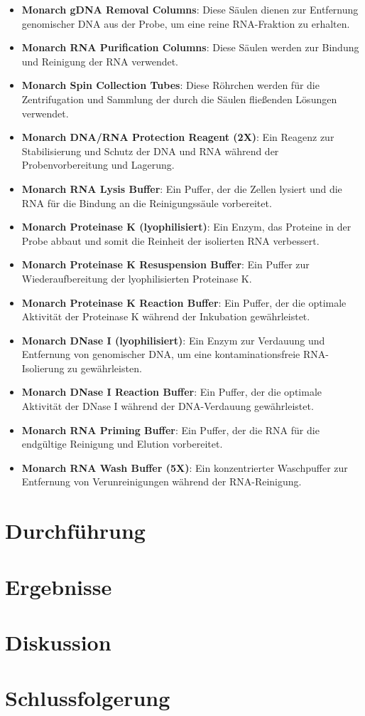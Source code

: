 \documentclass{article}
\begin{document}
\begin{itemize}
    \item \textbf{Monarch gDNA Removal Columns}: Diese Säulen dienen zur Entfernung genomischer DNA aus der Probe, um eine reine RNA-Fraktion zu erhalten.
    \item \textbf{Monarch RNA Purification Columns}: Diese Säulen werden zur Bindung und Reinigung der RNA verwendet.
    \item \textbf{Monarch Spin Collection Tubes}: Diese Röhrchen werden für die Zentrifugation und Sammlung der durch die Säulen fließenden Lösungen verwendet.
    \item \textbf{Monarch DNA/RNA Protection Reagent (2X)}: Ein Reagenz zur Stabilisierung und Schutz der DNA und RNA während der Probenvorbereitung und Lagerung.
    \item \textbf{Monarch RNA Lysis Buffer}: Ein Puffer, der die Zellen lysiert und die RNA für die Bindung an die Reinigungssäule vorbereitet.
    \item \textbf{Monarch Proteinase K (lyophilisiert)}: Ein Enzym, das Proteine in der Probe abbaut und somit die Reinheit der isolierten RNA verbessert.
    \item \textbf{Monarch Proteinase K Resuspension Buffer}: Ein Puffer zur Wiederaufbereitung der lyophilisierten Proteinase K.
    \item \textbf{Monarch Proteinase K Reaction Buffer}: Ein Puffer, der die optimale Aktivität der Proteinase K während der Inkubation gewährleistet.
    \item \textbf{Monarch DNase I (lyophilisiert)}: Ein Enzym zur Verdauung und Entfernung von genomischer DNA, um eine kontaminationsfreie RNA-Isolierung zu gewährleisten.
    \item \textbf{Monarch DNase I Reaction Buffer}: Ein Puffer, der die optimale Aktivität der DNase I während der DNA-Verdauung gewährleistet.
    \item \textbf{Monarch RNA Priming Buffer}: Ein Puffer, der die RNA für die endgültige Reinigung und Elution vorbereitet.
    \item \textbf{Monarch RNA Wash Buffer (5X)}: Ein konzentrierter Waschpuffer zur Entfernung von Verunreinigungen während der RNA-Reinigung.
\end{itemize}


\section{Durchführung}



\section{Ergebnisse}


\section{Diskussion}

\section{Schlussfolgerung}



\end{document}
